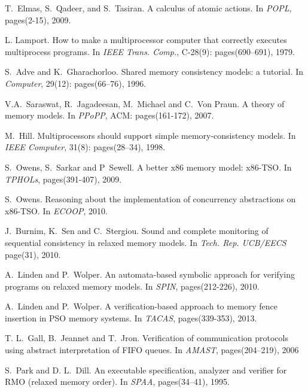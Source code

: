 \documentclass[preprint,9pt]{sigplanconf}
\begin{document}

\begin{thebibliography}{10}

T.~Elmas, S.~Qadeer, and S.~Tasiran.
\newblock A calculus of atomic actions.
\newblock In {\em POPL}, pages(2-15), 2009.

L. Lamport.
\newblock How to make a multiprocessor computer that correctly executes multiprocess programs.
\newblock In {\em IEEE Trans. Comp.}, C-28(9): pages(690–691), 1979.

S.~Adve and K.~Gharachorloo.
\newblock Shared memory consistency models: a tutorial.
\newblock In {\em Computer}, 29(12): pages(66–76), 1996.

V.A.~Saraswat, R.~Jagadeesan, M.~Michael and C.~Von Praun.
\newblock A theory of memory models.
\newblock In {\em PPoPP}, ACM: pages(161-172), 2007.

M.~Hill.
\newblock Multiprocessors should support simple memory-consistency models.
\newblock In {\em IEEE Computer}, 31(8): pages(28–34), 1998.

S.~Owens, S.~Sarkar and P~Sewell.
\newblock A better x86 memory model: x86-TSO.
\newblock In {\em TPHOLs}, pages(391-407), 2009.

S.~Owens.
\newblock Reasoning about the implementation of concurrency abstractions on x86-TSO.
\newblock In {\em ECOOP}, 2010.

J.~Burnim, K.~Sen and C.~Stergiou.
\newblock Sound and complete monitoring of sequential consistency in relaxed memory models.
\newblock In {\em Tech. Rep. UCB/EECS} page(31), 2010.

A.~Linden and P.~Wolper.
\newblock  An automata-based symbolic approach for verifying programs on relaxed memory models.
\newblock In {\em SPIN}, pages(212-226), 2010.

A.~Linden and P.~Wolper.
\newblock  A verification-based approach to memory fence insertion in PSO memory systems.
\newblock In {\em TACAS}, pages(339-353), 2013.

T. L.~Gall, B.~Jeannet and T.~Jron.
\newblock Verification of communication protocols using abstract interpretation of FIFO queues. 
\newblock In {\em AMAST}, pages(204–219), 2006

S.~Park and D. L.~Dill. 
\newblock An executable specification, analyzer and verifier for RMO (relaxed memory order).
\newblock In {\em SPAA}, pages(34–41), 1995.


\end{thebibliography}
\end{document}
